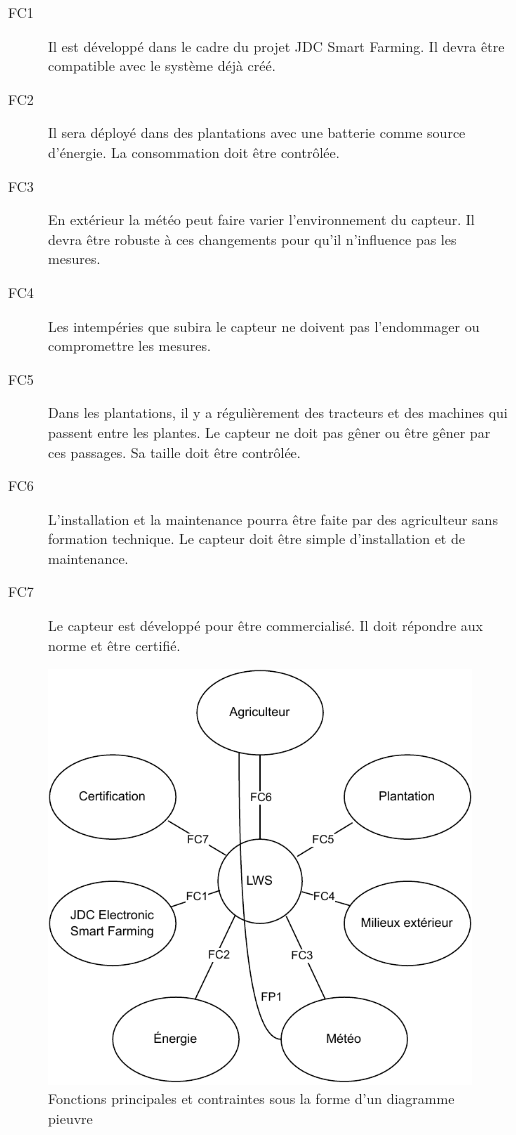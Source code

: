 \begin{description}
 \item[FC1] Il est développé dans le cadre du projet JDC Smart Farming. Il devra être compatible avec le système déjà créé. 
 \item[FC2] Il sera déployé dans des plantations avec une batterie comme source d'énergie. La consommation doit être contrôlée.   
 \item[FC3] En extérieur la météo peut faire varier l’environnement du capteur. Il devra être robuste à ces changements pour qu'il n’influence pas les mesures.
 \item[FC4] Les intempéries que subira le capteur ne doivent pas l’endommager ou compromettre les mesures.
 \item[FC5] Dans les plantations, il y a régulièrement des tracteurs et des machines qui passent entre les plantes. Le capteur ne doit pas gêner ou être gêner par ces passages. Sa taille doit être contrôlée.
 \item[FC6] L'installation et la maintenance pourra être faite par des agriculteur sans formation technique. Le capteur doit être simple d'installation et de maintenance.
 \item[FC7] Le capteur est développé pour être commercialisé. Il doit répondre aux norme et être certifié.
\end{description}

\newpage

\begin{figure}[!ht]
 \centering
 \includegraphics{DiagrammePieuvre.drawio.pdf}
 \caption{Fonctions principales et contraintes sous la forme d'un diagramme pieuvre}
\end{figure}


